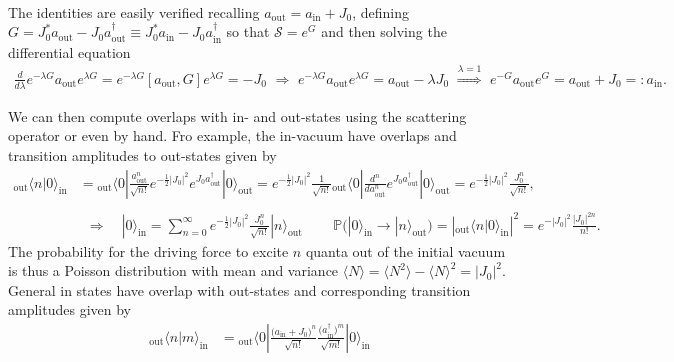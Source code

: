 \documentclass[../QFT_main.tex]{subfiles}
\begin{document}
\begin{mytheorem}
\begin{align}
\end{align}
The identities are easily verified recalling $a_{\mathrm{out}}=a_{\mathrm{in}}+J_0$, defining $G=J_0^* a_{\mathrm{out}}-J_0 a_{\mathrm{out}}^\dagger\equiv J_0^* a_{\mathrm{in}}-J_0 a_{\mathrm{in}}^\dagger$ so that $\mathcal{S}=e^G$ and then solving the differential equation
{\small\begin{align}
    \frac{d}{d\lambda} e^{-\lambda G} a_{\mathrm{out}} e^{\lambda G} = e^{-\lambda G} [a_{\mathrm{out}},G] e^{\lambda G} = -J_0\,\, \Rightarrow \,\, e^{-\lambda G} a_{\mathrm{out}} e^{\lambda G} = a_{\mathrm{out}} - \lambda J_0 \,\, \overset{\lambda=1}{\Rightarrow} \,\,e^{-G} a_{\mathrm{out}} e^{G} = a_{\mathrm{out}} + J_0 =: a_{\mathrm{in}}.
\end{align}}

We can then compute overlaps with in- and out-states using the scattering operator or even by hand.
Fro example, the in-vacuum have overlaps and transition amplitudes to out-states given by
{\small
\begin{align}
    {}_{\mathrm{out}}\langle n |0\rangle_{\mathrm{in}} &=  {}_{\mathrm{out}}\langle 0 | \frac{a_{\mathrm{out}}^n}{\sqrt{n!}} e^{-\frac{1}{2} |J_0|^2} e^{J_0 a_{\mathrm{out}}^\dagger} |0\rangle_{\mathrm{out}}
    = e^{-\frac{1}{2} |J_0|^2} \frac{1}{\sqrt{n!}} {}_{\mathrm{out}}\langle 0 | \frac{d^n}{d a_{\mathrm{out}}^n} e^{J_0 a_{\mathrm{out}}^\dagger} |0\rangle_{\mathrm{out}} = e^{-\frac{1}{2} |J_0|^2} \frac{J_0^n}{\sqrt{n!}},\\
    \\[4pt]
    &\,\,\,\Rightarrow\quad |0\rangle_{\mathrm{in}} = \sum_{n=0}^\infty e^{-\frac{1}{2} |J_0|^2} \frac{J_0^n}{\sqrt{n!}} |n\rangle_{\mathrm{out}}\, \qquad \mathbb{P}\Big(|0\rangle_{\mathrm{in}} \to |n\rangle_{\mathrm{out}}\Big) = \left|{}_{\mathrm{out}}\langle n |0\rangle_{\mathrm{in}}\right|^2 = e^{-|J_0|^2} \frac{|J_0|^{2n}}{n!}.
\end{align}
}
The probability for the driving force to excite $n$ quanta out of the initial vacuum is thus a Poisson distribution with mean and variance $\langle N \rangle =\langle N^2\rangle -\langle N\rangle^2= |J_0|^2$.
%
General in states have overlap with out-states and corresponding transition amplitudes given by
{\small
\begin{align}
    {}_{\mathrm{out}}\langle n | m \rangle_{\mathrm{in}} &= {}_{\mathrm{out}}\langle 0 | \frac{(a_{\mathrm{in}}+J_0\big)^n}{\sqrt{n!}}\frac{(a_{\mathrm{in}}^\dagger\big)^m}{\sqrt{m!}} |0\rangle_{\mathrm{in}}\\

\end{align}}
\end{mytheorem}
\end{document}
